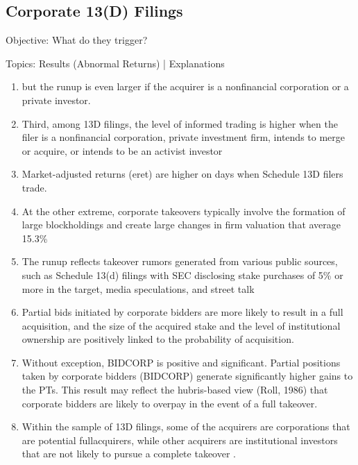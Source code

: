 \documentclass[12pt]{article}
\begin{document}
\subsection{Corporate 13(D) Filings}
\begin{center}
	Objective: What do they trigger? 
\end{center}
Topics: Results (Abnormal Returns) | Explanations 

	\begin{enumerate}
		\item but the runup is even larger if the acquirer is a nonfinancial corporation or a private investor.\citep{Brigida2012}

		\item Third, among 13D filings, the level of informed trading is higher when the filer is a nonfinancial corporation, private investment firm, intends to merge or acquire, or intends to be an activist investor \citep{Brigida2012}
	
		\item Market-adjusted returns (eret) are higher on days when Schedule 13D filers trade. \citep{Collin-Dufresne2015}
	
		\item At the other extreme, corporate takeovers typically involve the formation of large blockholdings and create large changes in firm valuation that average 15.3\% \citep{Denes2017}

		\item The runup reflects takeover rumors generated from various public sources, such as Schedule 13(d) filings with SEC disclosing stake purchases of 5\% or more in the target, media speculations, and street talk \citep{Mitchell2011}

		\item Partial bids initiated by corporate bidders are more likely to result in a full acquisition, and the size of the acquired stake and the level of institutional ownership are positively linked to the probability of acquisition.\citep{Akhigbe2007}

		\item Without exception, BIDCORP is positive and significant. Partial positions taken by corporate bidders (BIDCORP) generate significantly higher gains to the PTs. This result may reflect the hubris-based view (Roll, 1986) that corporate bidders are likely to overpay in the event of a full takeover. \citep{Akhigbe2007}

		\item Within the sample of 13D filings, some of the acquirers are corporations that are potential fullacquirers, while other acquirers are institutional investors that are not likely to pursue a complete takeover . \citep{Brigida2012}

	\end{enumerate}
\end{document}
